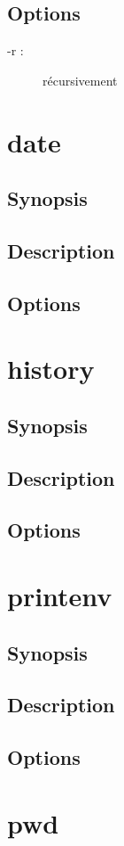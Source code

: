 \documentclass[a4paper, 10pt, onecolumn, openright, oneside]{book}
\begin{document}
			\subsection{Options}
				\begin{description}
				\item[-r :] récursivement
				\end{description}
		\section{date}
			\subsection{Synopsis}
			\subsection{Description}
			\subsection{Options}
		\section{history}
			\subsection{Synopsis}
			\subsection{Description}
			\subsection{Options}
		\section{printenv}
			\subsection{Synopsis}
			\subsection{Description}
			\subsection{Options}
		\section{pwd}
\end{document}
